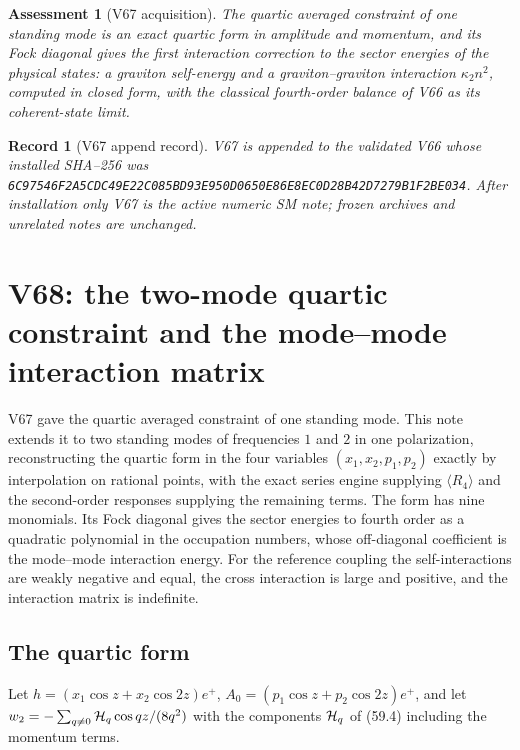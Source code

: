 \documentclass[11pt]{article}
\newtheorem{assessment}[theorem]{Assessment}
\newtheorem{record}[theorem]{Record}
\theoremstyle{remark}
\begin{document}
\begin{assessment}[V67 acquisition]
\label{ass:v19v67}
The quartic averaged constraint of one standing mode is an exact
quartic form in amplitude and momentum, and its Fock diagonal gives
the first interaction correction to the sector energies of the
physical states: a graviton self-energy and a graviton--graviton
interaction \(\kappa_2n^2\), computed in closed form, with the
classical fourth-order balance of V66 as its coherent-state limit.
\end{assessment}

\begin{record}[V67 append record]
\label{rec:v19v67}
V67 is appended to the validated V66 whose installed SHA--256 was
\texttt{6C97546F2A5CDC49E22C085BD93E950D0650E86E8EC0D28B42D7279B1F2BE034}.
After installation only V67 is the active numeric SM note; frozen
archives and unrelated notes are unchanged.
\end{record}


\section{V68: the two-mode quartic constraint and the mode--mode interaction matrix}
\label{sec:v19v68}

V67 gave the quartic averaged constraint of one standing mode.  This
note extends it to two standing modes of frequencies \(1\) and \(2\) in
one polarization, reconstructing the quartic form in the four
variables \((x_1,x_2,p_1,p_2)\) exactly by interpolation on rational
points, with the exact series engine supplying \(\langle R_4\rangle\)
and the second-order responses supplying the remaining terms.  The
form has nine monomials.  Its Fock diagonal gives the sector energies
to fourth order as a quadratic polynomial in the occupation numbers,
whose off-diagonal coefficient is the mode--mode interaction energy.
For the reference coupling the self-interactions are weakly negative
and equal, the cross interaction is large and positive, and the
interaction matrix is indefinite.

\subsection{The quartic form}

Let \(h=(x_1\cos z+x_2\cos2z)e^+\), \(A_0=(p_1\cos z+p_2\cos2z)e^+\), and
let \(w_2=-\sum_{q\neq0}{\cal H}_q\cos qz/(8q^2)\) with the components
\({\cal H}_q\) of (59.4) including the momentum terms.
\end{document}

